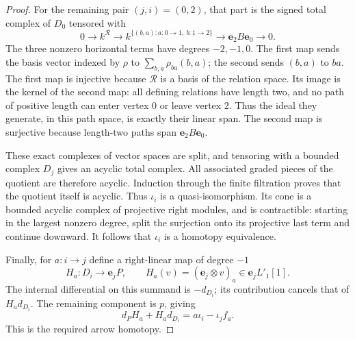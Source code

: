 \documentclass[11pt]{article}
\numberwithin{equation}{section}
\theoremstyle{definition}
\theoremstyle{remark}
\begin{document}
\begin{proof}
For the remaining pair \((j,i)=(0,2)\), that part is the signed total
complex of \(D_0\) tensored with
\[
 0\longrightarrow k^{\mathcal R}
 \longrightarrow k^{\{(b,a):a:0\to1,\ b:1\to2\}}
 \longrightarrow \mathbf e_2B\mathbf e_0
 \longrightarrow 0.
\]
The three nonzero horizontal terms have degrees \(-2,-1,0\).
The first map sends the basis vector indexed by \(\rho\) to
\(\sum_{b,a}\rho_{ba}(b,a)\); the second sends \((b,a)\) to \(ba\).
The first map is injective because \(\mathcal R\) is a basis of the
relation space.  Its image is the kernel of the second map: all
defining relations have length two, and no path of positive length
can enter vertex \(0\) or leave vertex \(2\).  Thus the ideal they
generate, in this path space, is exactly their linear span.  The
second map is surjective because length-two paths span
\(\mathbf e_2B\mathbf e_0\).

These exact complexes of vector spaces are split, and tensoring
with a bounded complex \(D_j\) gives an acyclic total complex.
All associated graded pieces of the quotient are therefore acyclic.
Induction through the finite filtration proves that the quotient
itself is acyclic.  Thus \(\iota_i\) is a quasi-isomorphism.
Its cone is a bounded acyclic complex of projective right modules,
and is contractible: starting in the largest nonzero degree, split
the surjection onto its projective last term and continue downward.
It follows that \(\iota_i\) is a homotopy equivalence.

Finally, for \(a:i\to j\) define a right-linear map of degree \(-1\)
\[
 H_a:D_i\longrightarrow\mathbf e_jP,\qquad
 H_a(v)=(\mathbf e_j\otimes v)_a
          \in\mathbf e_jL'_1[1].
\]
The internal differential on this summand is \(-d_{D_i}\);
its contribution cancels that of \(H_ad_{D_i}\).  The remaining
component is \(p\), giving
\[
 d_PH_a+H_ad_{D_i}
   =a\iota_i-\iota_jf_a .
\]
This is the required arrow homotopy.
\end{proof}
\end{document}
